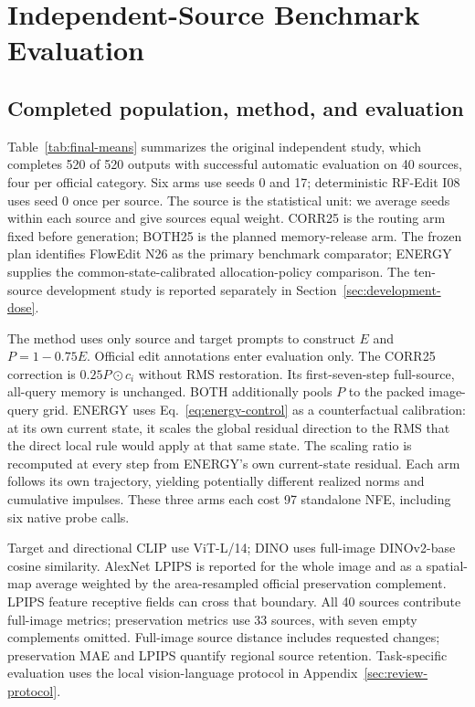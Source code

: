 \section{Independent-Source Benchmark Evaluation}
\label{sec:final-evaluation}
\subsection{Completed population, method, and evaluation}
Table~\ref{tab:final-means} summarizes the original independent study, which completes 520 of 520 outputs with successful automatic evaluation on 40 sources, four per official category. Six arms use seeds 0 and 17; deterministic RF-Edit I08 uses seed 0 once per source. The source is the statistical unit: we average seeds within each source and give sources equal weight. CORR25 is the routing arm fixed before generation; BOTH25 is the planned memory-release arm. The frozen plan identifies FlowEdit N26 as the primary benchmark comparator; ENERGY supplies the common-state-calibrated allocation-policy comparison. The ten-source development study is reported separately in Section~\ref{sec:development-dose}.

The method uses only source and target prompts to construct $E$ and $P=1-0.75E$. Official edit annotations enter evaluation only. The CORR25 correction is $0.25P\odot c_i$ without RMS restoration. Its first-seven-step full-source, all-query memory is unchanged. BOTH additionally pools $P$ to the packed image-query grid. ENERGY uses Eq.~\eqref{eq:energy-control} as a counterfactual calibration: at its own current state, it scales the global residual direction to the RMS that the direct local rule would apply at that same state. The scaling ratio is recomputed at every step from ENERGY's own current-state residual. Each arm follows its own trajectory, yielding potentially different realized norms and cumulative impulses. These three arms each cost 97 standalone NFE, including six native probe calls.

Target and directional CLIP use ViT-L/14; DINO uses full-image DINOv2-base cosine similarity. AlexNet LPIPS is reported for the whole image and as a spatial-map average weighted by the area-resampled official preservation complement. LPIPS feature receptive fields can cross that boundary. All 40 sources contribute full-image metrics; preservation metrics use 33 sources, with seven empty complements omitted. Full-image source distance includes requested changes; preservation MAE and LPIPS quantify regional source retention. Task-specific evaluation uses the local vision-language protocol in Appendix~\ref{sec:review-protocol}.

